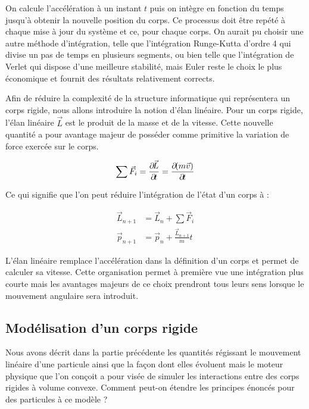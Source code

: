 On calcule l'accélération à un instant $t$ puis on intègre en fonction du temps jusqu'à obtenir la nouvelle position du corps. Ce processus doit être repété à chaque mise à jour du système et ce, pour chaque corps. On aurait pu choisir une autre méthode d'intégration, telle que l'intégration Runge-Kutta d'ordre 4 qui divise un pas de temps en plusieurs segments, ou bien telle que l'intégration de Verlet qui dispose d'une meilleure stabilité, mais Euler reste le choix le plus économique et fournit des résultats relativement corrects.

Afin de réduire la complexité de la structure informatique qui représentera un corps rigide, nous allons introduire la notion d'élan linéaire. Pour un corps rigide, l'élan linéaire $\vec{L}$ est le produit de la masse et de la vitesse. Cette nouvelle quantité a pour avantage majeur de posséder comme primitive la variation de force exercée sur le corps.

\begin{align*}
  {\sum \vec{F}_i} = \frac{\partial \! \vec{L}}{\partial \! t} = \frac{\partial \! (m\vec{v})}{\partial \! t}
\end{align*}

Ce qui signifie que l'on peut réduire l'intégration de l'état d'un corps à :

\begin{align*}
  \vec{L}_{n+1} &= \vec{L}_n + {\sum \vec{F}_i} \\
  \vec{p}_{n+1} &= \vec{p}_n + \frac{\vec{L}_{n+1}}{m} t
\end{align*}

L'élan linéaire remplace l'accélération dans la définition d'un corps et permet de calculer sa vitesse. Cette organisation permet à première vue une intégration plus courte mais les avantages majeurs de ce choix prendront tous leurs sens lorsque le mouvement angulaire sera introduit.

\subsection{Modélisation d'un corps rigide}

Nous avons décrit dans la partie précédente les quantités régissant le mouvement linéaire d'une particule ainsi que la façon dont elles évoluent mais le moteur physique que l'on conçoit a pour visée de simuler les interactions entre des corps rigides à volume convexe. Comment peut-on étendre les principes énoncés pour des particules à ce modèle ?


